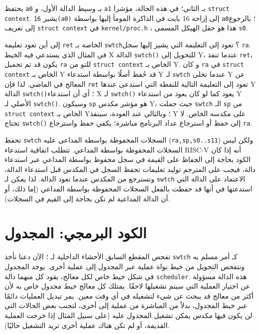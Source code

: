 يحتفظ {\tt a0} بـ وسيط الدالة الأول، و {\tt a1} بـ الثاني؛ في هذه الحالة، مؤشرا {\tt struct context}.
يشير {\tt 16(a0)} إلى إزاحة 16 بايت في الذاكرة المومأ إليها بواسطة {\tt a0}؛
بالرجوع إلى تعريف {\tt struct context} في {\tt kernel/proc.h} ، هذا هو حقل الهيكل المسمى {\tt s0}.

إلى أين تعود تعليمة {\tt ret} الخاصة بـ {\tt swtch}؟ تعود إلى التعليمة التي يشير إليها سجل {\tt ra}.
في المثال الذي يستدعي فيه الخيط X الدالة {\tt swtch()} للتحويل إلى Y، عندما تنفذ {\tt ret}، يكون قد تم تحميل {\tt ra} للتو من {\tt struct context} الخاص بـ Y.
و كان {\tt ra} في {\tt struct context} الخاص بـ Y قد حُفظ أصلًا بواسطة استدعاء Y لـ {\tt swtch} عندما تخلى Y عن المعالج في الماضي.
لذا فإن {\tt ret} تعود إلى التعليمة التالية للنقطة التي استدعى عندها Y الدالة {\tt swtch()}؛ أي أن استدعاء X لـ {\tt swtch()} يعود كما لو كان يعود من استدعاء Y الأصلي لـ {\tt swtch()}.
وسيكون {\tt sp} هو مؤشر مكدس Y، حيث حملت {\tt swtch} الـ {\tt sp} من {\tt struct context} الخاص بـ Y؛ وبالتالي عند العودة، سينفذ Y على مكدسه الخاص.
لا تحتاج {\tt swtch()} إلى حفظ أو استرجاع عداد البرنامج مباشرة؛ يكفي حفظ واسترجاع {\tt ra}.

تحفظ \lstinline{swtch} السجلات المحفوظة بواسطة المداعى عليه ({\tt ra,sp,s0..s11}) ولكن ليس السجلات المحفوظة بواسطة المداعي.
تتطلب اتفاقية استدعاء RISC-V أنه إذا كان الكود بحاجة إلى الحفاظ على القيمة في سجل محفوظ بواسطة المداعي عبر استدعاء دالة، فيجب على المترجم توليد تعليمات تحفظ السجل في المكدس قبل استدعاء الدالة، وتسترجع من المكدس عندما تعود الدالة.
لذا يمكن لـ \lstinline{swtch} الاعتماد على الدالة التي استدعتها في أنها قد حفظت بالفعل السجلات المحفوظة بواسطة المداعي (إما ذلك، أو أن الدالة المداعية لم تكن بحاجة إلى القيم في السجلات).

\section{الكود البرمجي: المجدول}
\label{sec:code_scheduling}

تفحص المقطع السابق الأحشاء الداخلية لـ ؛ الآن دعنا نأخذ \lstinline{swtch} كـ أمر مسلم به ونتفحص التحويل من خيط نواة عملية عبر المجدول إلى عملية أخرى.
يوجد المجدول في شكل خيط خاص لكل معالج، يقود كل منهما دالة \lstinline{scheduler}.
هذه الدالة مسؤولة عن اختيار العملية التي سيتم تشغيلها لاحقًا.
يمتلك كل معالج خيط مجدول خاص به لأن أكثر من معالج قد يبحث عن شيء لتشغيله في أي وقت معين.
يمر تبديل العمليات دائمًا عبر خيط المجدول، بدلاً من المباشرة من عملية إلى أخرى، لتجنب بعض الحالات التي لن يكون فيها مكدس يمكن تشغيل المجدول عليه (على سبيل المثال إذا خرجت العملية القديمة، أو لم تكن هناك عملية أخرى تريد التشغيل حاليًا).

